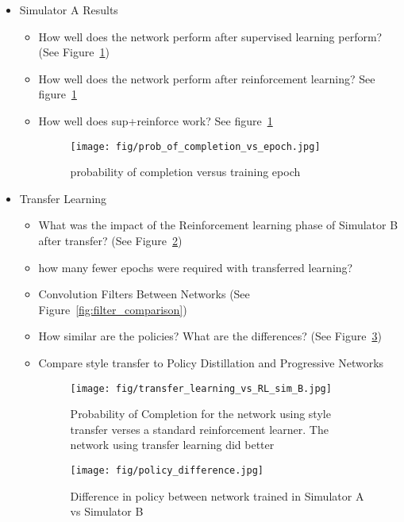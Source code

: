 \documentclass[paper=a4, fontsize=11pt]{scrartcl} %
\begin{document}
\begin{itemize}
	\item Simulator A Results
	\begin{itemize}
		\item How well does the network perform after supervised learning perform? (See Figure~\ref{fig:prob_completion_vs_epoch})
		\item How well does the network perform after reinforcement learning? See figure~\ref{fig:prob_completion_vs_epoch}
		\item How well does sup+reinforce work? See figure~\ref{fig:prob_completion_vs_epoch}
		\begin{figure}
		  \centering
			\texttt{[image: fig/prob\_of\_completion\_vs\_epoch.jpg]}
			\caption{probability of completion versus training epoch}
			\label{fig:prob_completion_vs_epoch}
		\end{figure}
	\end{itemize}

	\item Transfer Learning
	\begin{itemize}
	    \item What was the impact of the Reinforcement learning phase of Simulator B after transfer? (See Figure~\ref{fig:transfer_learning_vs_RL_sim_B})
		\item how many fewer epochs were required with transferred learning?
		\item Convolution Filters Between Networks (See Figure~\ref{fig:filter_comparison})
		\item How similar are the policies?  What are the differences? (See Figure~\ref{fig:policy_difference})
		\item Compare style transfer to Policy Distillation and Progressive Networks
		\begin{figure}
		  \centering
		  \texttt{[image: fig/transfer\_learning\_vs\_RL\_sim\_B.jpg]}
		  \caption{Probability of Completion for the network using style transfer verses a standard reinforcement learner.  The network using transfer learning did better}
		  \label{fig:transfer_learning_vs_RL_sim_B}
		\end{figure}

		\begin{figure}
		  \centering
		  \texttt{[image: fig/policy\_difference.jpg]}
		  \caption{Difference in policy between network trained in Simulator A vs Simulator B}
		  \label{fig:policy_difference}
		\end{figure}


\end{itemize}
\end{itemize}
\end{document}
